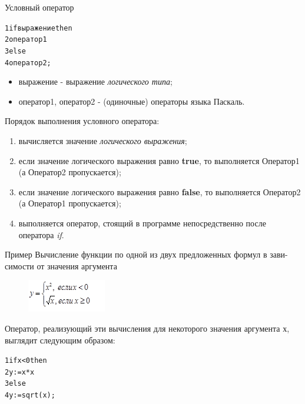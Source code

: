 \documentclass{beamer}
\begin{document}
\begin{frame}[fragile]{Условный оператор}
\begin{alltt}
1 if выражение then
2    оператор1
3 else
4    оператор2;
\end{alltt}
\begin{itemize}
\item выражение - выражение \textit{логического типа};
\item оператор1, оператор2 - (одиночные) операторы языка Паскаль.
\end{itemize}
Порядок выполнения условного оператора:
\begin{enumerate}
\item вычисляется значение \textit{логического выражения};
\item если значение логического выражения равно \textbf{true}, то выполняется Оператор1 (а Оператор2 пропускается);
\item если значение логического выражения равно \textbf{false}, то выполняется Оператор2 (а Оператор1 пропускается);
\item выполняется оператор, стоящий в программе непосредственно после оператора \textit{if}.
\end{enumerate}
\end{frame}

\begin{frame}[fragile]{Пример}
Вычисление функции по одной из двух предложенных формул в зави-симости от значения аргумента
\begin{figure}[h]
\centering
\includegraphics[scale=1]{images/lec03-pic04.png}
\end{figure}
Оператор, реализующий эти вычисления для некоторого значения аргумента х, выглядит следующим образом:
\begin{alltt}
1 if x < 0 then
2    y := x * x
3 else
4    y := sqrt(x);
\end{alltt}
\end{frame}
\end{document}
